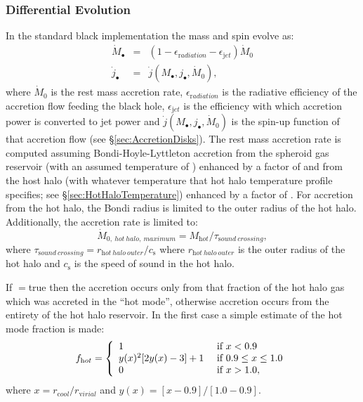 \subsubsection{Differential Evolution}

In the standard black implementation the mass and spin evolve as:
\begin{eqnarray}
\dot{M}_\bullet &=& (1-\epsilon_{\mathrm radiation}-\epsilon_{\mathrm jet}) \dot{M}_0 \\
\dot{j}_\bullet &=& \dot{j}(M_\bullet,j_\bullet,\dot{M}_0),
\end{eqnarray}
where $\dot{M}_0$ is the rest mass accretion rate, $\epsilon_{\mathrm radiation}$ is the radiative efficiency of the accretion flow feeding the black hole, $\epsilon_{\mathrm jet}$ is the efficiency with which accretion power is converted to jet power and $\dot{j}(M_\bullet,j_\bullet,\dot{M}_0)$ is the spin-up function of that accretion flow (see \S\ref{sec:AccretionDisks}). The rest mass accretion rate is computed assuming Bondi-Hoyle-Lyttleton accretion from the spheroid gas reservoir (with an assumed temperature of {\normalfont \ttfamily [bondiHoyleAccretionTemperatureSpheroid]}) enhanced by a factor of {\normalfont \ttfamily [bondiHoyleAccretionEnhancementSpheroid]} and from the host halo (with whatever temperature that hot halo temperature profile specifies; see \S\ref{sec:HotHaloTemperature}) enhanced by a factor of {\normalfont \ttfamily [bondiHoyleAccretionEnhancementHotHalo]}. For accretion from the hot halo, the Bondi radius is limited to the outer radius of the hot halo. Additionally, the accretion rate is limited to:
\begin{equation}
 \dot{M}_{\mathrm 0,~hot~halo,~maximum} = M_{\mathrm hot}/\tau_{\mathrm sound~crossing},
\end{equation}
where $\tau_{\mathrm sound~crossing}=r_{\mathrm hot~halo~outer}/c_{\mathrm s}$ where $r_{\mathrm hot~halo~outer}$ is the outer radius of the hot halo and $c_{\mathrm s}$ is the speed of sound in the hot halo.

If {\normalfont \ttfamily [bondiHoyleAccretionHotModeOnly]}$=${\normalfont \ttfamily true} then the accretion occurs only from that fraction of the hot halo gas which was accreted in the ``hot mode'', otherwise accretion 
occurs from the entirety of the hot halo reservoir. In the first case a simple estimate of the hot mode fraction is made:
\begin{equation}
f_{\mathrm hot} = \left\{ \begin{array}{ll} 1 & \hbox{ if } x < 0.9 \\ y(x)^2[2 y(x) - 3]+1  & \hbox{ if } 0.9 \le x \le 1.0 \\ 0 & \hbox{ if } x > 1.0, \end{array} \right.
\end{equation}
where $x = r_{\mathrm cool}/r_{\mathrm virial}$ and $y(x)=[x-0.9]/[1.0-0.9]$.

